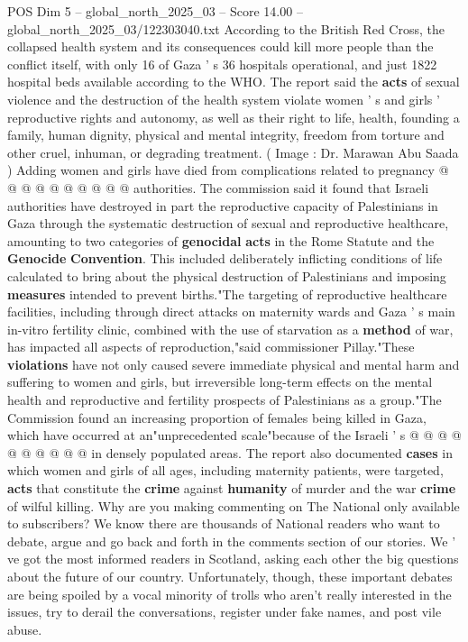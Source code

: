 \begin{textsample}{POS Dim 5 – global\_north\_2025\_03 – Score 14.00 – global\_north\_2025\_03/122303040.txt}
According to the British Red Cross, the collapsed health system and its consequences could kill more people than the conflict itself, with only 16 of Gaza ' s 36 hospitals operational, and just 1822 hospital beds available according to the WHO.
The report said the \textbf{acts} of sexual violence and the destruction of the health system violate women ' s and girls ' reproductive rights and autonomy, as well as their right to life, health, founding a family, human dignity, physical and mental integrity, freedom from torture and other cruel, inhuman, or degrading treatment. ( Image : Dr.
Marawan Abu Saada ) Adding women and girls have died from complications related to pregnancy @ @ @ @ @ @ @ @ @ @ authorities.
The commission said it found that Israeli authorities have destroyed in part the reproductive capacity of Palestinians in Gaza through the systematic destruction of sexual and reproductive healthcare, amounting to two categories of \textbf{genocidal} \textbf{acts} in the Rome Statute and the \textbf{Genocide} \textbf{Convention}.
This included deliberately inflicting conditions of life calculated to bring about the physical destruction of Palestinians and imposing \textbf{measures} intended to prevent births."The targeting of reproductive healthcare facilities, including through direct attacks on maternity wards and Gaza ' s main in-vitro fertility clinic, combined with the use of starvation as a \textbf{method} of war, has impacted all aspects of reproduction,"said commissioner Pillay."These \textbf{violations} have not only caused severe immediate physical and mental harm and suffering to women and girls, but irreversible long-term effects on the mental health and reproductive and fertility prospects of Palestinians as a group."The Commission found an increasing proportion of females being killed in Gaza, which have occurred at an"unprecedented scale"because of the Israeli ' s @ @ @ @ @ @ @ @ @ @ in densely populated areas.
The report also documented \textbf{cases} in which women and girls of all ages, including maternity patients, were targeted, \textbf{acts} that constitute the \textbf{crime} against \textbf{humanity} of murder and the war \textbf{crime} of wilful killing.
Why are you making commenting on The National only available to subscribers?
We know there are thousands of National readers who want to debate, argue and go back and forth in the comments section of our stories.
We ' ve got the most informed readers in Scotland, asking each other the big questions about the future of our country.
Unfortunately, though, these important debates are being spoiled by a vocal minority of trolls who aren't really interested in the issues, try to derail the conversations, register under fake names, and post vile abuse.

\end{textsample}
